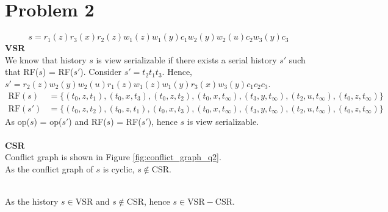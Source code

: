 \documentclass[12pt]{article}
\begin{document}
\section*{Problem 2}
\begin{equation*}
    s = r_1(z) r_3(x) r_2(z) w_1(z) w_1(y) c_1 w_2(y) w_2(u) c_2 w_3(y) c_3
\end{equation*}
\textbf{VSR} \\
We know that history $s$ is view serializable if there exists a serial history $s'$ such that RF($s$) = RF($s'$).
Consider $s' = t_2 t_1 t_3$. Hence, $s' = r_2(z) w_2(y) w_2(u) r_1(z) w_1(z) w_1(y) r_3(x) w_3(y) c_1 c_2 c_3$.\\
\begin{equation*}
    \begin{aligned}
        \text{RF}(s) &= \{(t_0, z, t_1), (t_0, x, t_3), (t_0, z, t_2), (t_0, x, t_\infty), (t_3, y, t_\infty), (t_2, u, t_\infty), (t_0, z, t_\infty) \} \\
        \text{RF}(s') &= \{(t_0, z, t_2), (t_0, z, t_1), (t_0, x, t_3), (t_0, x, t_\infty), (t_3, y, t_\infty), (t_2, u, t_\infty), (t_0, z, t_\infty) \}
    \end{aligned}
\end{equation*}
As op($s$) = op($s'$) and RF($s$) = RF($s'$), hence $s$ is view serializable.\\
\\
\textbf{CSR} \\
Conflict graph is shown in Figure \ref{fig:conflict_graph_q2}.\\ As the conflict graph of $s$ is cyclic, $ s \notin \text{CSR}$.
\begin{figure*}[h]
    \centering
    \caption{Conflict Graph}
    \label{fig:conflict_graph_q2}
\end{figure*}
\\
As the history $s \in \text{VSR}$ and $s \notin \text{CSR}$, hence $s \in \text{VSR} - \text{CSR}$.
\end{document}
